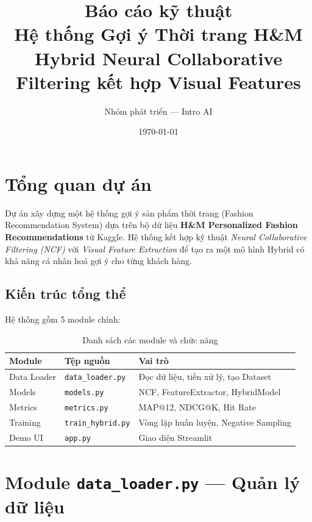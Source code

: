 \documentclass[12pt,a4paper]{article}
\title{%
    \textbf{Báo cáo kỹ thuật}\\[6pt]
    \Large Hệ thống Gợi ý Thời trang H\&M\\
    \large Hybrid Neural Collaborative Filtering kết hợp Visual Features
}
\author{Nhóm phát triển — Intro AI}
\date{\today}
\begin{document}
\maketitle
\tableofcontents
\newpage

\section{Tổng quan dự án}

Dự án xây dựng một hệ thống gợi ý sản phẩm thời trang (Fashion Recommendation System)
dựa trên bộ dữ liệu \textbf{H\&M Personalized Fashion Recommendations} từ Kaggle.
Hệ thống kết hợp kỹ thuật \textit{Neural Collaborative Filtering (NCF)} với
\textit{Visual Feature Extraction} để tạo ra một mô hình Hybrid có khả năng
cá nhân hoá gợi ý cho từng khách hàng.

\subsection{Kiến trúc tổng thể}

Hệ thống gồm 5 module chính:

\begin{table}[H]
\centering
\caption{Danh sách các module và chức năng}
\begin{tabular}{lll}
\toprule
\textbf{Module} & \textbf{Tệp nguồn} & \textbf{Vai trò} \\
\midrule
Data Loader      & \texttt{data\_loader.py}   & Đọc dữ liệu, tiền xử lý, tạo Dataset \\
Models           & \texttt{models.py}         & NCF, FeatureExtractor, HybridModel \\
Metrics          & \texttt{metrics.py}        & MAP@12, NDCG@K, Hit Rate \\
Training         & \texttt{train\_hybrid.py}  & Vòng lặp huấn luyện, Negative Sampling \\
Demo UI          & \texttt{app.py}            & Giao diện Streamlit \\
\bottomrule
\end{tabular}
\end{table}

\section{Module \texttt{data\_loader.py} — Quản lý dữ liệu}
\end{document}
